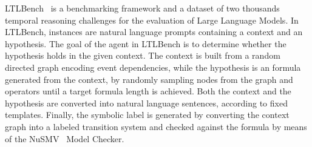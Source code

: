 LTLBench~\cite{tang2024ltlbench} is a benchmarking framework and a dataset of two thousands temporal reasoning challenges for the evaluation of Large Language Models. In LTLBench, instances are natural language prompts containing a context and an hypothesis. The goal of the agent in LTLBench is to determine whether the hypothesis holds in the given context. The context is built from a random directed graph encoding event dependencies, while the hypothesis is an \LTL formula generated from the context, by randomly sampling nodes from the graph and \LTL operators until a target formula length is achieved. Both the context and the hypothesis are converted into natural language sentences, according to fixed templates. Finally, the symbolic label is generated by converting the context graph into a labeled transition system and checked against the \LTL formula by means of the NuSMV~\cite{cimatti2002nusmv} Model Checker. %